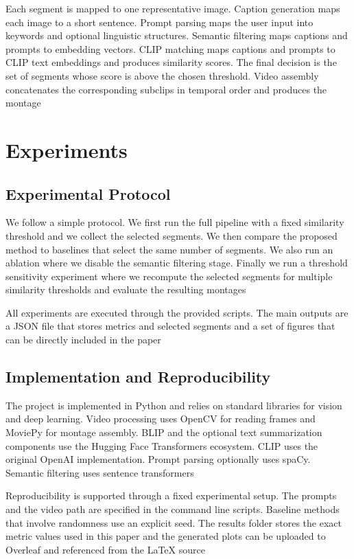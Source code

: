 \documentclass[conference,compsoc]{IEEEtran}
\begin{document}
Each segment is mapped to one representative image. Caption generation maps each image to a short sentence. Prompt parsing maps the user input into keywords and optional linguistic structures. Semantic filtering maps captions and prompts to embedding vectors. CLIP matching maps captions and prompts to CLIP text embeddings and produces similarity scores. The final decision is the set of segments whose score is above the chosen threshold. Video assembly concatenates the corresponding subclips in temporal order and produces the montage

\section{Experiments}

\subsection{Experimental Protocol}
We follow a simple protocol. We first run the full pipeline with a fixed similarity threshold and we collect the selected segments. We then compare the proposed method to baselines that select the same number of segments. We also run an ablation where we disable the semantic filtering stage. Finally we run a threshold sensitivity experiment where we recompute the selected segments for multiple similarity thresholds and evaluate the resulting montages

All experiments are executed through the provided scripts. The main outputs are a JSON file that stores metrics and selected segments and a set of figures that can be directly included in the paper

\subsection{Implementation and Reproducibility}
The project is implemented in Python and relies on standard libraries for vision and deep learning. Video processing uses OpenCV for reading frames and MoviePy for montage assembly. BLIP and the optional text summarization components use the Hugging Face Transformers ecosystem. CLIP uses the original OpenAI implementation. Prompt parsing optionally uses spaCy. Semantic filtering uses sentence transformers

Reproducibility is supported through a fixed experimental setup. The prompts and the video path are specified in the command line scripts. Baseline methods that involve randomness use an explicit seed. The results folder stores the exact metric values used in this paper and the generated plots can be uploaded to Overleaf and referenced from the LaTeX source
\end{document}
